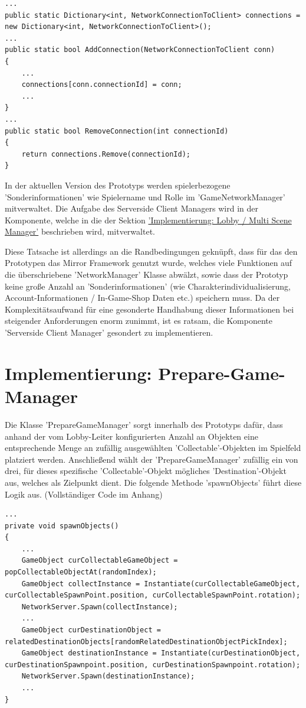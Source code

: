 \begin{lstlisting}[caption= Mirror Class NetworkServer.cs Connection Handling]
...
public static Dictionary<int, NetworkConnectionToClient> connections = new Dictionary<int, NetworkConnectionToClient>();
...
public static bool AddConnection(NetworkConnectionToClient conn)
{
	...
	connections[conn.connectionId] = conn;
	...
}
...
public static bool RemoveConnection(int connectionId)
{
	return connections.Remove(connectionId);
}
\end{lstlisting}

In der aktuellen Version des Prototyps werden spielerbezogene 'Sonderinformationen' wie Spielername und Rolle im 'GameNetworkManager'  mitverwaltet. Die Aufgabe des Serverside Client Managers wird in der Komponente, welche in die der Sektion \hyperref[Lobby Manager Implementierung]{'Implementierung: Lobby / Multi Scene Manager'} beschrieben wird, mitverwaltet. 

Diese Tatsache ist allerdings an die Randbedingungen geknüpft, dass für das den Prototypen das Mirror Framework genutzt wurde, welches viele Funktionen auf die überschriebene 'NetworkManager' Klasse abwälzt, sowie dass der Prototyp keine große Anzahl an 'Sonderinformationen' (wie Charakterindividualisierung, Account-Informationen / In-Game-Shop Daten etc.) speichern muss. Da der Komplexitätsaufwand für eine gesonderte Handhabung dieser Informationen bei steigender Anforderungen enorm zunimmt, ist es ratsam, die Komponente 'Serverside Client Manager' gesondert zu implementieren.

\section{Implementierung: Prepare-Game-Manager}
\label{Implementierung:prepare_game_manager}

Die Klasse 'PrepareGameManager' sorgt innerhalb des Prototyps dafür, dass anhand der vom Lobby-Leiter konfigurierten Anzahl an Objekten eine entsprechende Menge an zufällig ausgewählten 'Collectable'-Objekten im Spielfeld platziert werden. Anschließend wählt der 'PrepareGameManager' zufällig ein von drei, für dieses spezifische 'Collectable'-Objekt mögliches 'Destination'-Objekt aus, welches als Zielpunkt dient. Die folgende Methode 'spawnObjects' führt diese Logik aus. (Vollständiger Code im Anhang)

\begin{lstlisting}[caption= PrepareGameManager.cs Variablen und spawnObjects()]
...
private void spawnObjects()
{	
	...	
	GameObject curCollectableGameObject = popCollectableObjectAt(randomIndex);
	GameObject collectInstance = Instantiate(curCollectableGameObject, curCollectableSpawnPoint.position, curCollectableSpawnPoint.rotation);
	NetworkServer.Spawn(collectInstance);
	...
	GameObject curDestinationObject = relatedDestinationObjects[randomRelatedDestinationObjectPickIndex];
	GameObject destinationInstance = Instantiate(curDestinationObject, curDestinationSpawnpoint.position, curDestinationSpawnpoint.rotation);
	NetworkServer.Spawn(destinationInstance);
	...
}
\end{lstlisting}

